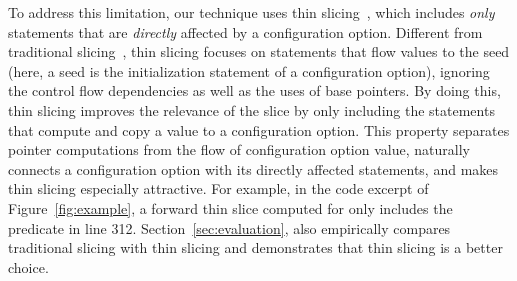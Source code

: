 

To address this limitation, our technique uses thin
slicing~\cite{Sridharan:2007}, which includes
\textit{only} statements that are \textit{directly} affected by a configuration option.
Different from traditional slicing~\cite{Horwitz:1988}, thin slicing
focuses on statements that flow values to the seed (here, a
seed is the initialization statement of a configuration option), ignoring the 
control flow dependencies as well as the uses of
base pointers. By doing this, thin slicing improves the relevance
of the slice by only including the statements that compute
and copy a value to a configuration option.
This property separates
pointer computations from the flow of configuration option value,
naturally connects a configuration option with its
directly affected statements, and makes thin slicing
especially attractive.
For example, in the code excerpt of
Figure~\ref{fig:example},
a forward thin slice computed for 
only includes the predicate in line 312.
Section~\ref{sec:evaluation}, 
also empirically compares traditional slicing with
thin slicing and demonstrates that thin slicing is a better choice.




% 

